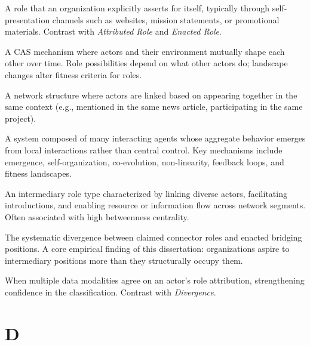 \documentclass[../main.tex]{subfiles}
\begin{document}
\begin{description}[leftmargin=0.5cm, style=nextline]

\item[Claimed Role] A role that an organization explicitly asserts for itself, typically through self-presentation channels such as websites, mission statements, or promotional materials. Contrast with \textit{Attributed Role} and \textit{Enacted Role}.

\item[Co-evolution] A CAS mechanism where actors and their environment mutually shape each other over time. Role possibilities depend on what other actors do; landscape changes alter fitness criteria for roles.

\item[Co-Location Network] A network structure where actors are linked based on appearing together in the same context (e.g., mentioned in the same news article, participating in the same project).

\item[Complex Adaptive System (CAS)] A system composed of many interacting agents whose aggregate behavior emerges from local interactions rather than central control. Key mechanisms include emergence, self-organization, co-evolution, non-linearity, feedback loops, and fitness landscapes.

\item[Connector] An intermediary role type characterized by linking diverse actors, facilitating introductions, and enabling resource or information flow across network segments. Often associated with high betweenness centrality.

\item[Connector Gap] The systematic divergence between claimed connector roles and enacted bridging positions. A core empirical finding of this dissertation: organizations aspire to intermediary positions more than they structurally occupy them.

\item[Convergence (Cross-Modal)] When multiple data modalities agree on an actor's role attribution, strengthening confidence in the classification. Contrast with \textit{Divergence}.

\end{description}

\section*{D}
\end{document}
